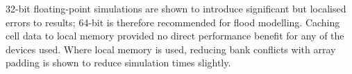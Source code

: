 32-bit floating-point simulations are shown to introduce significant but localised errors to results; 64-bit is therefore recommended for flood modelling. Caching cell data to local memory provided no direct performance benefit for any of the devices used. Where local memory is used, reducing bank conflicts with array padding is shown to reduce simulation times slightly.

